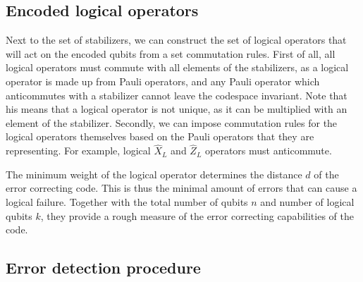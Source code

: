 \subsection{Encoded logical operators}

Next to the set of stabilizers, we can construct the set of logical operators that will act on the encoded qubits from a set commutation rules. First of all, all logical operators must commute with all elements of the stabilizers, as a logical operator is made up from Pauli operators, and any Pauli operator which anticommutes with a stabilizer cannot leave the codespace invariant. Note that his means that a logical operator is not unique, as it can be multiplied with an element of the stabilizer. Secondly, we can impose commutation rules for the logical operators themselves based on the Pauli operators that they are representing. For example, logical $\hat{X}_L$ and $\hat{Z}_L$ operators must anticommute.

The minimum weight of the logical operator determines the distance $d$ of the error correcting code. This is thus the minimal amount of errors that can cause a logical failure. Together with the total number of qubits $n$ and number of logical qubits $k$, they provide a rough measure of the error correcting capabilities of the code.

\subsection{Error detection procedure}

